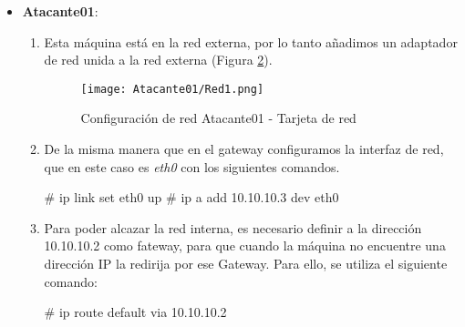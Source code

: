\begin{itemize}
\begin{enumerate}
\item Por último, permitimos que el gateway reenvíe los paquetes que le llegan, para eso se utiliza el siguiente comando: 
\begin{listing}[style=consola, numbers=none]
# echo 1 > /proc/sys/net/ipv4/ip_forward
\end{listing}

\item La configuración final de la máquina se puede observar en la Figura \ref{Gateway-Red2}.
\begin{figure}[H] %
\begin{center}
\texttt{[image: Gateway/Red2.png]}
\end{center}
\caption{Configuración de red Gateway}
\label{Gateway-Red2}
\end{figure}
\end{enumerate}

\item \textbf{Atacante01}:

\begin{enumerate}

\item Esta máquina está en la red externa, por lo tanto añadimos un adaptador de red unida a la red externa (Figura \ref{Atacante01-Red1}). 
\begin{figure}[H] %
\begin{center}
\texttt{[image: Atacante01/Red1.png]}
\end{center}
\caption{Configuración de red Atacante01 - Tarjeta de red}
\label{Atacante01-Red1}
\end{figure}

\item De la misma manera que en el gateway configuramos la interfaz de red, que en este caso es {\it eth0} con los siguientes comandos. 
\begin{listing}[style=consola, numbers=none]
# ip link set eth0 up
# ip a add 10.10.10.3 dev eth0 
\end{listing}

\item Para poder alcazar la red interna, es necesario definir a la dirección 10.10.10.2 como fateway, para que cuando la máquina no encuentre una dirección IP la redirija por ese Gateway. Para ello, se utiliza el siguiente comando: 

\begin{listing}[style=consola, numbers=none]
# ip route default via 10.10.10.2
\end{listing}

\end{enumerate}
\end{itemize}

